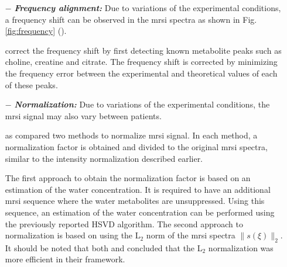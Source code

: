 \begin{enumerate}[leftmargin=*]
	\item[$-$] \textbf{\textit{Frequency alignment:}} Due to variations of the experimental conditions, a frequency shift can be observed in the \ac{mrsi} spectra as shown in Fig. \ref{fig:frequency} (\cite{Chen2002,Osorio-Garcia2012}).
	
\cite{Tiwari2012} correct the frequency shift by first detecting known metabolite peaks such as choline, creatine and citrate. The frequency shift is corrected by minimizing the frequency error between the experimental and theoretical values of each of these peaks.

	\item[$-$] \textbf{\textit{Normalization:}} Due to variations of the experimental conditions, the \ac{mrsi} signal may also vary between patients.
	
\cite{Parfait2012} as \cite{Devos2004} compared two methods to normalize \ac{mrsi} signal. In each method, a normalization factor is obtained and divided to the original \ac{mrsi} spectra, similar to the intensity normalization described earlier. 

The first approach to obtain the normalization factor is based on an estimation of the water concentration. It is required to have an additional \ac{mrsi} sequence where the water metabolites are unsuppressed. Using this sequence, an estimation of the water concentration can be performed using the previously reported HSVD algorithm.  The second approach to normalization is based on using the L$_2$ norm of the \ac{mrsi} spectra $\|s(\xi)\|_2$. 
It should be noted that both \cite{Parfait2012} and \cite{Devos2004} concluded that the L$_2$ normalization was more efficient in their framework.
 
\end{enumerate}